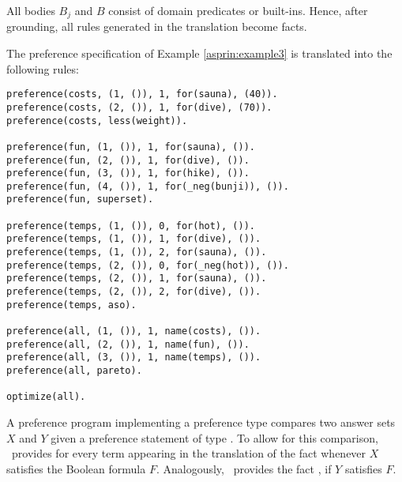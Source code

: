 \begin{note}
All bodies $B_j$ and $B$ consist of domain predicates or built-ins. 
Hence, after grounding, all rules generated in the translation become facts.
\end{note}

\begin{example}
The preference specification of Example \ref{asprin:example3} is translated into the following rules:
\begin{lstlisting}[numbers=none,escapechar=?]
preference(costs, (1, ()), 1, for(sauna), (40)).
preference(costs, (2, ()), 1, for(dive), (70)).
preference(costs, less(weight)).

preference(fun, (1, ()), 1, for(sauna), ()).
preference(fun, (2, ()), 1, for(dive), ()).
preference(fun, (3, ()), 1, for(hike), ()).
preference(fun, (4, ()), 1, for(_neg(bunji)), ()).
preference(fun, superset).

preference(temps, (1, ()), 0, for(hot), ()).
preference(temps, (1, ()), 1, for(dive), ()).
preference(temps, (1, ()), 2, for(sauna), ()).
preference(temps, (2, ()), 0, for(_neg(hot)), ()).
preference(temps, (2, ()), 1, for(sauna), ()).
preference(temps, (2, ()), 2, for(dive), ()).
preference(temps, aso).

preference(all, (1, ()), 1, name(costs), ()).
preference(all, (2, ()), 1, name(fun), ()).
preference(all, (3, ()), 1, name(temps), ()).
preference(all, pareto).

optimize(all).
\end{lstlisting}
\end{example}


A preference program implementing a preference type 
compares two answer sets $X$ and $Y$
given a preference statement  of type . %
To allow for this comparison, 
\asprin\ provides
for every term  appearing in the translation of 
the fact  
whenever $X$ satisfies the Boolean formula $F$.
Analogously, \asprin\ provides the fact , if $Y$ satisfies $F$.

